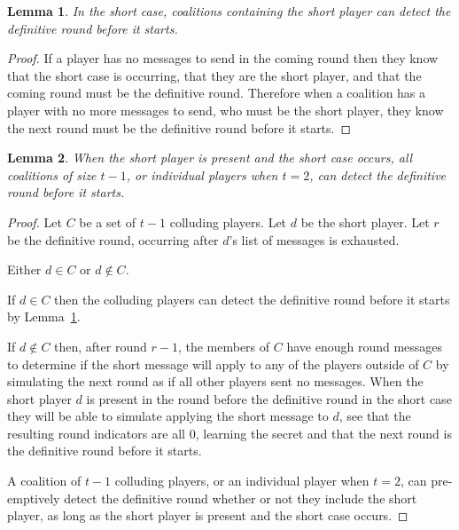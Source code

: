 \documentclass{dalcsthesis}
\newtheorem{lemma}{Lemma}
\begin{document}
\begin{lemma}\label{Lem:SUIP:ShortPlayerCoalitionsPremptivelyKnowShortRound}In the short case, coalitions containing the short player can detect the definitive round before it starts.\end{lemma}
\begin{proof}
If a player has no messages to send in the coming round then they know that the short case is occurring, that they are the short player, and that the coming round must be the definitive round. Therefore when a coalition has a player with no more messages to send, who must be the short player, they know the next round must be the definitive round before it starts.
\end{proof}

\begin{lemma}\label{Lem:SUIP:MaxSizeCoalitionsPremptivelyKnowShortRound}When the short player is present and the short case occurs, all coalitions of size $t-1$, or individual players when $t = 2$, can detect the definitive round before it starts.\end{lemma}
\begin{proof}
Let $C$ be a set of $t-1$ colluding players. Let $d$ be the short player. Let $r$ be the definitive round, occurring after $d$'s list of messages is exhausted.

Either $d \in C$ or $d \notin C$.

If $d \in C$ then the colluding players can detect the definitive round before it starts by Lemma~\ref{Lem:SUIP:ShortPlayerCoalitionsPremptivelyKnowShortRound}.

If $d \notin C$ then, after round $r-1$, the members of $C$ have enough round messages to determine if the short message will apply to any of the players outside of $C$ by simulating the next round as if all other players sent no messages. When the short player $d$ is present in the round before the definitive round in the short case they will be able to simulate applying the short message to $d$, see that the resulting round indicators are all $0$, learning the secret and that the next round is the definitive round before it starts.

A coalition of $t-1$ colluding players, or an individual player when $t=2$, can pre-emptively detect the definitive round whether or not they include the short player, as long as the short player is present and the short case occurs.
\end{proof}
 
\end{document}
